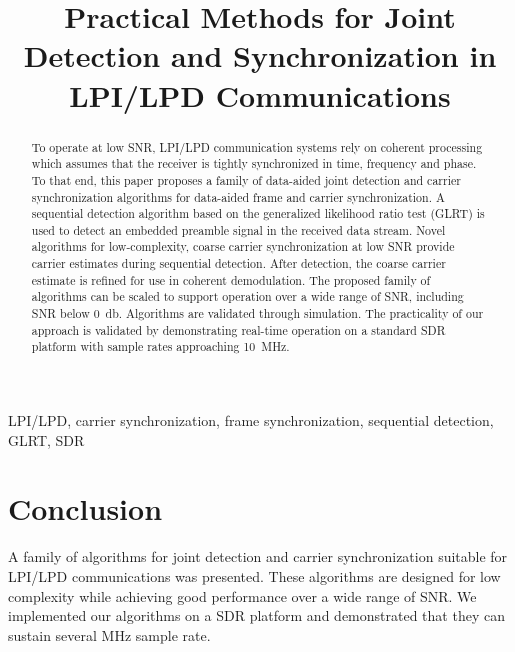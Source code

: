 \documentclass[10pt,final,conference,comsoc]{IEEEtran}
\begin{document}
\title{Practical Methods for Joint Detection and Synchronization in
  LPI/LPD Communications}
\author{
}

\maketitle

\begin{abstract}
  To operate at low SNR, LPI/LPD communication systems rely on
  coherent processing which assumes that the receiver is tightly
  synchronized in time, frequency and phase. 
  To that end, this paper proposes a family of data-aided joint
  detection and carrier synchronization algorithms for data-aided
  frame and carrier synchronization.
  A sequential detection algorithm based on the generalized likelihood ratio test (GLRT)
  is used to detect an embedded preamble signal in the received data
  stream.
  Novel algorithms for low-complexity, coarse carrier synchronization
  at low SNR provide carrier estimates
  during sequential detection.
  After detection,
  the coarse carrier estimate is refined for use in coherent demodulation.
  The proposed family of algorithms can be scaled to support operation
  over a wide range of SNR, including SNR below \SI{0}{\decibel}.
  Algorithms are validated through simulation.
  The practicality of our approach is validated by demonstrating  real-time operation on
  a standard SDR platform with sample rates approaching
  \SI{10}{\mega\hertz}.
\end{abstract}

\begin{IEEEkeywords}
LPI/LPD, carrier synchronization, frame synchronization, sequential
detection, GLRT, SDR
\end{IEEEkeywords}













\section{Conclusion}

A family of algorithms for joint detection and carrier synchronization
suitable for LPI/LPD communications was presented.
These algorithms are designed for low complexity while achieving good
performance over a wide range of SNR.\@
We implemented our algorithms on a SDR platform and demonstrated that
they can sustain several \si{\mega\hertz} sample rate.



\end{document}
